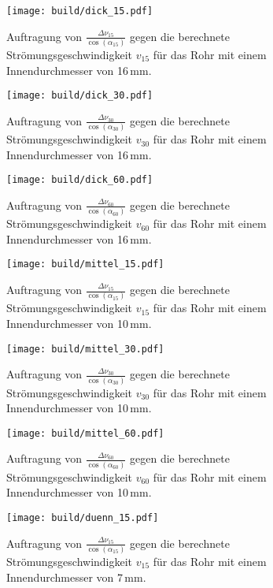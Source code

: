 \newpage
{}
\label{sec:Anhang}

\begin{figure}
  \centering
  \texttt{[image: build/dick\_15.pdf]}
  \caption{Auftragung von $\frac{\Delta \nu_{15}}{\cos(\alpha_{15})}$ gegen die berechnete
  Strömungsgeschwindigkeit $v_{15}$ für das Rohr mit einem Innendurchmesser von 16\,mm.}
  \label{fig:dick_15}
\end{figure}

\begin{figure}
  \centering
  \texttt{[image: build/dick\_30.pdf]}
  \caption{Auftragung von $\frac{\Delta \nu_{30}}{\cos(\alpha_{30})}$ gegen die berechnete
  Strömungsgeschwindigkeit $v_{30}$ für das Rohr mit einem Innendurchmesser von 16\,mm.}
  \label{fig:dick_30}
\end{figure}

\begin{figure}
  \centering
  \texttt{[image: build/dick\_60.pdf]}
  \caption{Auftragung von $\frac{\Delta \nu_{60}}{\cos(\alpha_{60})}$ gegen die berechnete
  Strömungsgeschwindigkeit $v_{60}$ für das Rohr mit einem Innendurchmesser von 16\,mm.}
  \label{fig:dick_60}
\end{figure}

\begin{figure}
  \centering
  \texttt{[image: build/mittel\_15.pdf]}
  \caption{Auftragung von $\frac{\Delta \nu_{15}}{\cos(\alpha_{15})}$ gegen die berechnete
  Strömungsgeschwindigkeit $v_{15}$ für das Rohr mit einem Innendurchmesser von 10\,mm.}
  \label{fig:mittel_15}
\end{figure}

\begin{figure}
  \centering
  \texttt{[image: build/mittel\_30.pdf]}
  \caption{Auftragung von $\frac{\Delta \nu_{30}}{\cos(\alpha_{30})}$ gegen die berechnete
  Strömungsgeschwindigkeit $v_{30}$ für das Rohr mit einem Innendurchmesser von 10\,mm.}
  \label{fig:mittel_30}
\end{figure}

\begin{figure}
  \centering
  \texttt{[image: build/mittel\_60.pdf]}
  \caption{Auftragung von $\frac{\Delta \nu_{60}}{\cos(\alpha_{60})}$ gegen die berechnete
  Strömungsgeschwindigkeit $v_{60}$ für das Rohr mit einem Innendurchmesser von 10\,mm.}
  \label{fig:mittel_60}
\end{figure}

\begin{figure}
  \centering
  \texttt{[image: build/duenn\_15.pdf]}
  \caption{Auftragung von $\frac{\Delta \nu_{15}}{\cos(\alpha_{15})}$ gegen die berechnete
  Strömungsgeschwindigkeit $v_{15}$ für das Rohr mit einem Innendurchmesser von 7\,mm.}
  \label{fig:duenn_15}
\end{figure}


